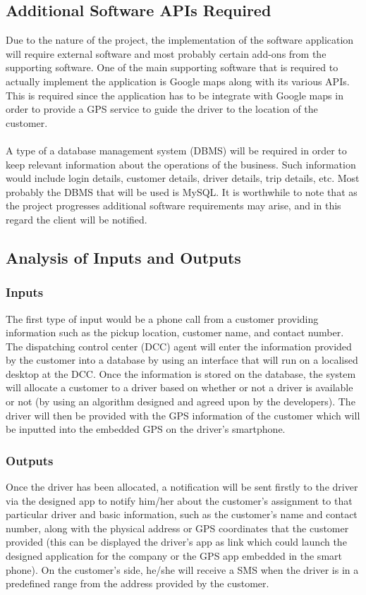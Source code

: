 \documentclass[a4paper,12pt]{article}
\begin{document}
\subsection{Additional Software APIs Required}
Due to the nature of the project, the implementation of the software application will require external software and most probably certain add-ons from the supporting software. One of the main supporting software that is required to actually implement the application is Google maps along with its various APIs. This is required since the application has to be integrate with Google maps in order to provide a GPS service to guide the driver to the location of the customer. \\\\
A type of a database management system (DBMS) will be required in order to keep relevant information about the operations of the business. Such information would include login details, customer details, driver details, trip details, etc. Most probably the DBMS that will be used is MySQL. It is worthwhile to note that as the project progresses additional software requirements may arise, and in this regard the client will be notified.

\subsection{Analysis of Inputs and Outputs}
\subsubsection{Inputs}
The first type of input would be a phone call from a customer providing information such as the pickup location, customer name, and contact number. The dispatching control center (DCC) agent will enter the information provided by the customer into a database by using an interface that will run on a localised desktop at the DCC. Once the information is stored on the database, the system will allocate a customer to a driver based on whether or not a driver is available or not (by using an algorithm designed and agreed upon by the developers). The driver will then be provided with the GPS information of the customer which will be inputted into the embedded GPS on the driver's smartphone.

\subsubsection{Outputs}
Once the driver has been allocated, a notification will be sent firstly to the driver via the designed app to notify him/her about the customer's assignment to that particular driver and basic information, such as the customer's name and contact number, along with the physical address or GPS coordinates that the customer provided (this can be displayed the driver's app as link which could launch the designed application for the company or the GPS app embedded in the smart phone). On the customer's side, he/she will receive a SMS when the driver is in a predefined range from the address provided by the customer.
\end{document}
